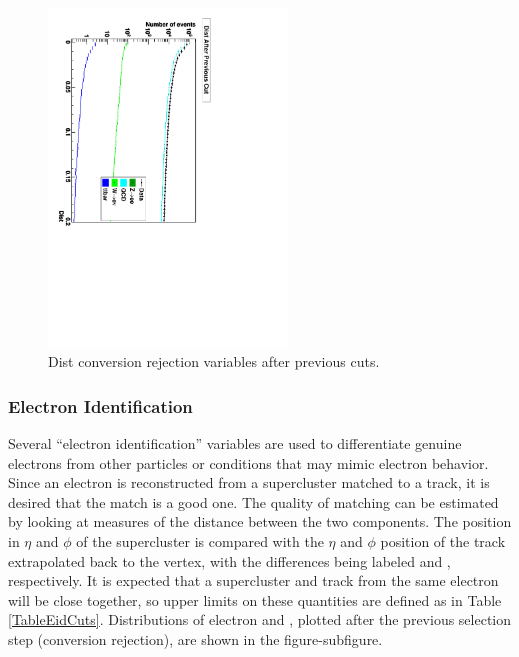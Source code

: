  \begin{figure}[htb]
  \begin{center}
    \includegraphics[width=180pt, angle=90]{Figures/distSeq.pdf}
  \end{center}
  \caption[Dist conversion rejection variables after previous cuts]{Dist conversion rejection variables after previous cuts.}
  \label{fig:DistConvRejVars}
 \end{figure}


\subsubsection{Electron Identification}
\label{evSel:eid}
Several ``electron identification'' variables are used to differentiate genuine electrons 
from other particles or conditions that may mimic electron behavior.  
Since an electron is reconstructed from a supercluster matched to a track, it is desired that the match is a good one.
The quality of matching can be estimated by looking at measures of the distance between the two components.
The position in $ \eta $ and $ \phi $ of the supercluster is compared with 
the $ \eta $ and $ \phi $ position of the track extrapolated back to the vertex, 
with the differences being labeled \detain and \dphiin, respectively.  
It is expected that a supercluster and track from the same electron will be close together, 
so upper limits on these quantities are defined as in Table \ref{TableEidCuts}.  
Distributions of electron \detain and \dphiin, plotted after the previous selection step (conversion rejection),
are shown in the figure-subfigure.  

